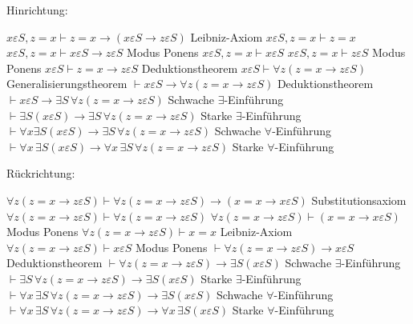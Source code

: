 \begin{solution}
Hinrichtung:
\begin{algorithmic}[1]
    \State $x \varepsilon S, z = x \vdash z = x \rightarrow
    (x \varepsilon S \rightarrow z \varepsilon S)$
    \Comment Leibniz-Axiom
    \State $x \varepsilon S, z = x \vdash z = x$
    \State $x \varepsilon S, z = x \vdash x \varepsilon S \rightarrow z \varepsilon S$
    \Comment Modus Ponens
    \State $x \varepsilon S, z = x \vdash x \varepsilon S$
    \State $x \varepsilon S, z = x \vdash z \varepsilon S$
    \Comment Modus Ponens
    \State $x \varepsilon S \vdash z = x \rightarrow z \varepsilon S$
    \Comment Deduktionstheorem
    \State $x \varepsilon S \vdash \forall z (z = x \rightarrow z \varepsilon S)$
    \Comment Generalisierungstheorem
    \State $\vdash x \varepsilon S \rightarrow \forall z (z = x \rightarrow z \varepsilon S)$
    \Comment Deduktionstheorem
    \State $\vdash x \varepsilon S \rightarrow \exists S\, \forall z (z = x \rightarrow z \varepsilon S)$
    \Comment Schwache $\exists$-Einführung
    \State $\vdash \exists S (x \varepsilon S) \rightarrow \exists S\, \forall z (z = x \rightarrow z \varepsilon S)$
    \Comment Starke $\exists$-Einführung
    \State $\vdash \forall x \exists S (x \varepsilon S) \rightarrow \exists S\, \forall z (z = x \rightarrow z \varepsilon S)$
    \Comment Schwache $\forall$-Einführung
    \State $\vdash \forall x\, \exists S (x \varepsilon S) \rightarrow \forall x\, \exists S\, \forall z (z = x \rightarrow z \varepsilon S)$
    \Comment Starke $\forall$-Einführung
\end{algorithmic}
Rückrichtung:
\begin{algorithmic}[1]
    \State $\forall z (z = x \rightarrow z \varepsilon S) \vdash
    \forall z (z = x \rightarrow z \varepsilon S)
    \rightarrow (x = x \rightarrow x \varepsilon S)$
    \Comment Substitutionsaxiom
    \State $\forall z(z = x \rightarrow z \varepsilon S) \vdash \forall z (z = x \rightarrow z \varepsilon S)$
    \State $\forall z(z = x \rightarrow z \varepsilon S) \vdash (x = x \rightarrow x \varepsilon S)$
    \Comment Modus Ponens
    \State $\forall z(z = x \rightarrow z \varepsilon S) \vdash x = x$
    \Comment Leibniz-Axiom
    \State $\forall z(z = x \rightarrow z \varepsilon S) \vdash x \varepsilon S$
    \Comment Modus Ponens
    \State $\vdash \forall z (z = x \rightarrow z \varepsilon S) \rightarrow x \varepsilon S$
    \Comment Deduktionstheorem
    \State $\vdash \forall z (z = x \rightarrow z \varepsilon S) \rightarrow \exists S (x \varepsilon S)$
    \Comment Schwache $\exists$-Einführung
    \State $\vdash \exists S\, \forall z (z = x \rightarrow z \varepsilon S) \rightarrow \exists S (x \varepsilon S)$
    \Comment Starke $\exists$-Einführung
    \State $\vdash \forall x\, \exists S\, \forall z (z = x \rightarrow z \varepsilon S) \rightarrow \exists S (x \varepsilon S)$
    \Comment Schwache $\forall$-Einführung
    \State $\vdash \forall x\, \exists S\, \forall z (z = x \rightarrow z \varepsilon S)
    \rightarrow \forall x\, \exists S (x \varepsilon S)$
    \Comment Starke $\forall$-Einführung
\end{algorithmic}
\end{solution}

